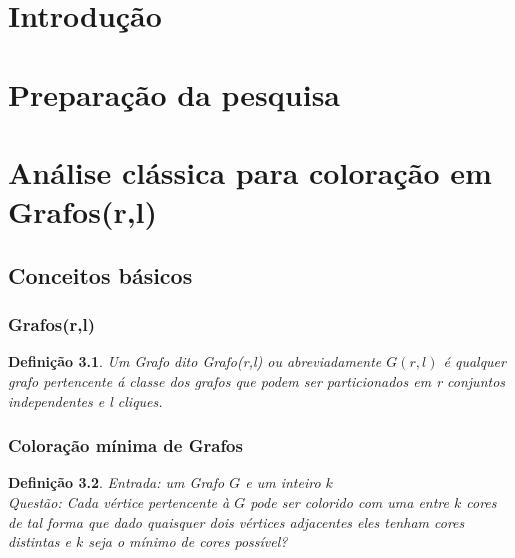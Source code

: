 \documentclass[a4paper,oneside,12pt]{book}
\newtheorem{definition}{Definição}
\begin{document}
\thispagestyle{myheadings}



\pagebreak
{}


\chapter{Introdução} \label{cap:introducao}
\chapter{Preparação da pesquisa}
\chapter{Análise clássica para coloração em Grafos(r,l)}
\section{Conceitos básicos}
    \subsection{Grafos(r,l)}
     \begin{definition}
         Um Grafo dito Grafo(r,l) ou abreviadamente $G(r,l)$ é qualquer grafo pertencente á classe dos grafos que podem ser particionados em r conjuntos independentes e l cliques.
     \end{definition}
    \subsection{Coloração mínima de Grafos}
     \begin{definition}
         Entrada: um Grafo $G$ e um inteiro $k$\\
  Questão: Cada vértice pertencente à $G$ pode ser colorido com uma entre $k$ cores
  de tal forma que dado quaisquer dois vértices adjacentes eles tenham cores distintas e $k$ seja o mínimo de cores possível?
     \end{definition}
\end{document}

